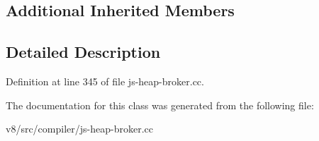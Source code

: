 \subsection*{Additional Inherited Members}


\subsection{Detailed Description}


Definition at line 345 of file js-\/heap-\/broker.\+cc.



The documentation for this class was generated from the following file\+:\begin{DoxyCompactItemize}
\item 
v8/src/compiler/js-\/heap-\/broker.\+cc\end{DoxyCompactItemize}
